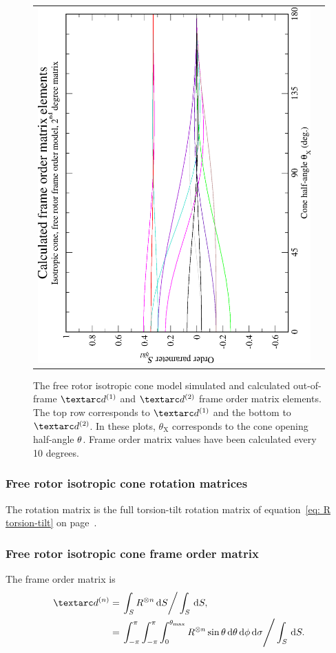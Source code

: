 \begin{figure}
\begin{tabular}{@{}cc@{}}
    \includegraphics[width=.35\textwidth,angle=270]{images/frame_order_matrix/Sijkl_iso_cone_free_rotor_out_of_frame_theta_x_calc.eps} \\
  \end{tabular}
  \caption[Free-rotor isotropic cone simulated and calculated out-of-frame Daeg$^{(1)}$ and Daeg$^{(2)}$ elements.]{
    The free rotor isotropic cone model simulated and calculated out-of-frame $\FOone$ and $\FOtwo$ frame order matrix elements.
    The top row corresponds to $\FOone$ and the bottom to $\FOtwo$.
    In these plots, $\theta_\textrm{X}$ corresponds to the cone opening half-angle $\theta$.
    Frame order matrix values have been calculated every 10 degrees.
  }
  \label{fig: simulated and calculated out-of-frame 1st and 2nd degree iso cone, free rotor frame order}
\end{figure}


\subsubsection{Free rotor isotropic cone rotation matrices}

The rotation matrix is the full torsion-tilt rotation matrix of equation~\ref{eq: R torsion-tilt} on page~\pageref{eq: R torsion-tilt}.

\subsubsection{Free rotor isotropic cone frame order matrix}

The frame order matrix is
\begin{subequations}
\begin{align}
    \FOn &= \left. \int_S R^{\otimes n} \diff S \right / \int_S \diff S , \\
         &= \left. \int_{-\pi}^{\pi} \int_{-\pi}^{\pi} \int_{0}^{\conethetamax} R^{\otimes n} \sin\theta \diff\theta \diff\phi \diff\sigma  \right / \int_S \diff S .
\end{align}
\end{subequations}

